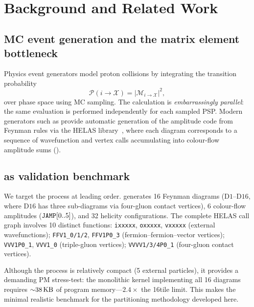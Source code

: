 
\section{Background and Related Work}\label{sec:background}

\subsection{MC event generation and the matrix element bottleneck}

Physics event generators model proton collisions by integrating the transition
probability
\begin{equation}
  \mathcal{P}(i\to\mathcal{X})
  = \left|\mathcal{M}_{i\to\mathcal{X}}\right|^2,
  \label{eq:me}
\end{equation}
over phase space using MC sampling.  The calculation is \emph{embarrassingly
parallel}: the same \ME evaluation is performed independently for each sampled
PSP.  Modern generators such as \amcnlo provide automatic generation of the
amplitude code from Feynman rules via the HELAS
library~\cite{Murayama:1992gi}, where each diagram corresponds to a sequence
of wavefunction and vertex calls accumulating into colour-flow amplitude sums
(\jamp).

\subsection{\ggttg as validation benchmark}\label{sec:process}

We target the \ggttg process at leading order.  \mgfive generates 16 Feynman
diagrams ($\mathrm{D1}$--$\mathrm{D16}$, where $\mathrm{D16}$ has three
sub-diagrams via four-gluon contact vertices), 6 colour-flow amplitudes
($\texttt{JAMP}[0..5]$), and 32 helicity configurations.  The complete HELAS call
graph involves 10 distinct functions:
\texttt{ixxxxx}, \texttt{oxxxxx}, \texttt{vxxxxx} (external wavefunctions);
\texttt{FFV1\_0/1/2}, \texttt{FFV1P0\_3} (fermion--fermion--vector vertices);
\texttt{VVV1P0\_1}, \texttt{VVV1\_0} (triple-gluon vertices);
\texttt{VVVV1/3/4P0\_1} (four-gluon contact vertices).

Although the process is relatively compact (5 external particles), it provides
a demanding PM stress-test: the monolithic kernel implementing all 16 diagrams
requires ${\sim}38\,\text{KB}$ of program memory---$2.4\times$ the 16\KB tile limit.
This makes \ggttg the minimal realistic benchmark for the partitioning
methodology developed here.

